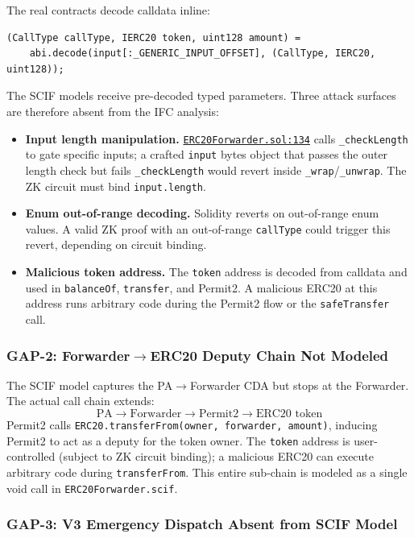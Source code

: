 \documentclass[11pt,a4paper]{article}
\newcommand{\fwdRepoRoot}{https://github.com/anoma/anomapay-erc20-forwarder/blob/main/contracts/src}
\newcommand{\fwdref}[3]{\href{\fwdRepoRoot/#1#2\#L#3}{\nolinkurl{#2:#3}}}
\begin{document}
The real contracts decode calldata inline:
\begin{lstlisting}[style=soliditystyle]
(CallType callType, IERC20 token, uint128 amount) =
    abi.decode(input[:_GENERIC_INPUT_OFFSET], (CallType, IERC20, uint128));
\end{lstlisting}
The SCIF models receive pre-decoded typed parameters. Three attack surfaces
are therefore absent from the IFC analysis:
\begin{itemize}
  \item \textbf{Input length manipulation.} \fwdref{}{ERC20Forwarder.sol}{134}
    calls \texttt{\_checkLength} to gate specific inputs; a crafted
    \texttt{input} bytes object that passes the outer length check but fails
    \texttt{\_checkLength} would revert inside \texttt{\_wrap}/\texttt{\_unwrap}.
    The ZK circuit must bind \texttt{input.length}.
  \item \textbf{Enum out-of-range decoding.} Solidity reverts on out-of-range
    enum values. A valid ZK proof with an out-of-range \texttt{callType} could
    trigger this revert, depending on circuit binding.
  \item \textbf{Malicious token address.} The \texttt{token} address is decoded
    from calldata and used in \texttt{balanceOf}, \texttt{transfer}, and Permit2.
    A malicious ERC20 at this address runs arbitrary code during the Permit2 flow
    or the \texttt{safeTransfer} call.
\end{itemize}

\subsubsection{GAP-2: Forwarder$\to$ERC20 Deputy Chain Not Modeled}

The SCIF model captures the PA$\to$Forwarder CDA but stops at the Forwarder.
The actual call chain extends:
\[
  \text{PA} \to \text{Forwarder} \to \text{Permit2} \to \text{ERC20 token}
\]
Permit2 calls \texttt{ERC20.transferFrom(owner, forwarder, amount)}, inducing
Permit2 to act as a deputy for the token owner. The \texttt{token} address is
user-controlled (subject to ZK circuit binding); a malicious ERC20 can execute
arbitrary code during \texttt{transferFrom}. This entire sub-chain is modeled
as a single void call in \texttt{ERC20Forwarder.scif}.

\subsubsection{GAP-3: V3 Emergency Dispatch Absent from SCIF Model}
\end{document}
